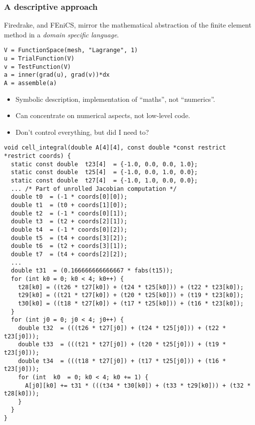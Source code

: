 \documentclass[presentation]{beamer}
\begin{document}
\bgroup
{}
\begin{frame}[plain]
\end{frame}
\begin{frame}[plain]
\end{frame}
\egroup

\begin{frame}[fragile]
  \frametitle{A descriptive approach}
  Firedrake, and FEniCS, mirror the mathematical abstraction of the
  finite element method in a \emph{domain specific language}.

  \begin{center}
\begin{verbatim}
V = FunctionSpace(mesh, "Lagrange", 1)
u = TrialFunction(V)
v = TestFunction(V)
a = inner(grad(u), grad(v))*dx
A = assemble(a)
\end{verbatim}
  \end{center}
  \begin{itemize}
  \item Symbolic description, implementation of ``maths'', not
    ``numerics''.
  \item Can concentrate on numerical aspects, not low-level code.
  \item Don't control everything, but did I need to?
  \end{itemize}
\end{frame}

\begin{frame}[fragile]
\begin{verbatim}
void cell_integral(double A[4][4], const double *const restrict *restrict coords) {
  static const double  t23[4]  = {-1.0, 0.0, 0.0, 1.0};
  static const double  t25[4]  = {-1.0, 0.0, 1.0, 0.0};
  static const double  t27[4]  = {-1.0, 1.0, 0.0, 0.0};
  ... /* Part of unrolled Jacobian computation */
  double t0  = (-1 * coords[0][0]);
  double t1  = (t0 + coords[1][0]);
  double t2  = (-1 * coords[0][1]);
  double t3  = (t2 + coords[2][1]);
  double t4  = (-1 * coords[0][2]);
  double t5  = (t4 + coords[3][2]);
  double t6  = (t2 + coords[3][1]);
  double t7  = (t4 + coords[2][2]);
  ...
  double t31  = (0.166666666666667 * fabs(t15));
  for (int k0 = 0; k0 < 4; k0++) {
    t28[k0] = ((t26 * t27[k0]) + (t24 * t25[k0])) + (t22 * t23[k0]);
    t29[k0] = ((t21 * t27[k0]) + (t20 * t25[k0])) + (t19 * t23[k0]);
    t30[k0] = ((t18 * t27[k0]) + (t17 * t25[k0])) + (t16 * t23[k0]);
  }
  for (int j0 = 0; j0 < 4; j0++) {
    double t32  = (((t26 * t27[j0]) + (t24 * t25[j0])) + (t22 * t23[j0]));
    double t33  = (((t21 * t27[j0]) + (t20 * t25[j0])) + (t19 * t23[j0]));
    double t34  = (((t18 * t27[j0]) + (t17 * t25[j0])) + (t16 * t23[j0]));
    for (int  k0  = 0; k0 < 4; k0 += 1) {
      A[j0][k0] += t31 * (((t34 * t30[k0]) + (t33 * t29[k0])) + (t32 * t28[k0]));
    }
  }
}
\end{verbatim}
\end{frame}
\end{document}
